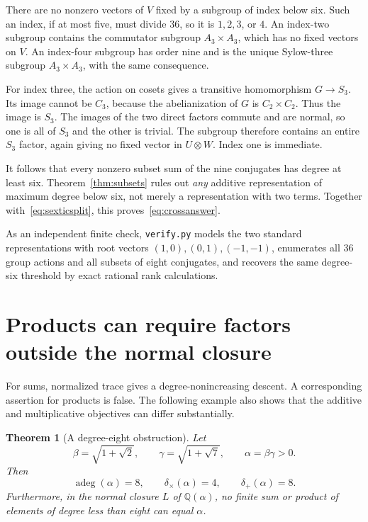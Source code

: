 \documentclass[11pt,letterpaper]{article}
\newtheorem{theorem}{Theorem}[section]
\theoremstyle{definition}\newtheorem{definition}[theorem]{Definition}
\theoremstyle{remark}\newtheorem{remark}[theorem]{Remark}
\newcommand{\Q}{\mathbb Q}
\newcommand{\ad}{\operatorname{adeg}}
\newcommand{\ds}{\delta_{+}}
\newcommand{\dm}{\delta_{\times}}
\newcommand{\WL}[1]{\texttt{#1}}
\begin{document}
There are no nonzero vectors of $V$ fixed by a subgroup of index below six. Such an index, if at most five, must divide $36$, so it is $1,2,3$, or $4$. An index-two subgroup contains the commutator subgroup $A_3\times A_3$, which has no fixed vectors on $V$. An index-four subgroup has order nine and is the unique Sylow-three subgroup $A_3\times A_3$, with the same consequence.

For index three, the action on cosets gives a transitive homomorphism $G\to S_3$. Its image cannot be $C_3$, because the abelianization of $G$ is $C_2\times C_2$. Thus the image is $S_3$. The images of the two direct factors commute and are normal, so one is all of $S_3$ and the other is trivial. The subgroup therefore contains an entire $S_3$ factor, again giving no fixed vector in $U\otimes W$. Index one is immediate.

It follows that every nonzero subset sum of the nine conjugates has degree at least six. Theorem~\ref{thm:subsets} rules out \emph{any} additive representation of maximum degree below six, not merely a representation with two terms. Together with~\eqref{eq:sexticsplit}, this proves~\eqref{eq:crossanswer}.

As an independent finite check, \WL{verify.py} models the two standard representations with root vectors $(1,0),(0,1),(-1,-1)$, enumerates all $36$ group actions and all subsets of eight conjugates, and recovers the same degree-six threshold by exact rational rank calculations.

\section{Products can require factors outside the normal closure}
\label{sec:counterexample}
For sums, normalized trace gives a degree-nonincreasing descent. A corresponding assertion for products is false. The following example also shows that the additive and multiplicative objectives can differ substantially.

\begin{theorem}[A degree-eight obstruction]
\label{thm:counterexample}
Let
\begin{equation}
 \beta=\sqrt{1+\sqrt2},\qquad
 \gamma=\sqrt{1+\sqrt7},\qquad
 \alpha=\beta\gamma>0.
 \label{eq:counteralpha}
\end{equation}
Then
\begin{equation}
 \ad(\alpha)=8,\qquad \dm(\alpha)=4,\qquad \ds(\alpha)=8.
 \label{eq:counterdegrees}
\end{equation}
Furthermore, in the normal closure $L$ of $\Q(\alpha)$, no finite sum or product of elements of degree less than eight can equal $\alpha$.
\end{theorem}
\end{document}
